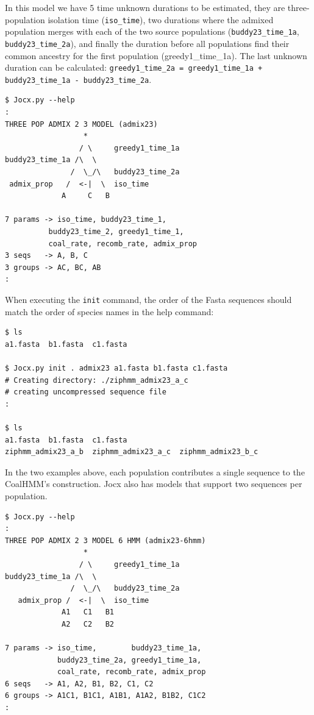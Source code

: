 \documentclass[graybox]{svmult}
\begin{document}

In this model we have 5 time unknown durations to be estimated, they are three-population isolation time (\texttt{iso\_time}), two durations where the admixed population merges with each of the two source populations (\texttt{buddy23\_time\_1a}, \texttt{buddy23\_time\_2a}), and finally the duration before all populations find their common ancestry for the first population (greedy1\_time\_1a).  The last unknown duration can be calculated: \texttt{greedy1\_time\_2a = greedy1\_time\_1a + buddy23\_time\_1a - buddy23\_time\_2a}.

 {\scriptsize{}\begin{verbatim}
$ Jocx.py --help
:
THREE POP ADMIX 2 3 MODEL (admix23)
                  *
                 / \     greedy1_time_1a
buddy23_time_1a /\  \
               /  \_/\   buddy23_time_2a
 admix_prop   /  <-|  \  iso_time
             A     C   B

7 params -> iso_time, buddy23_time_1,
          buddy23_time_2, greedy1_time_1,
          coal_rate, recomb_rate, admix_prop
3 seqs   -> A, B, C
3 groups -> AC, BC, AB
:
\end{verbatim}}

When executing the \texttt{init} command, the order of the Fasta sequences should match the order of species names in the help command:

 {\scriptsize{}\begin{verbatim}
$ ls
a1.fasta  b1.fasta  c1.fasta

$ Jocx.py init . admix23 a1.fasta b1.fasta c1.fasta
# Creating directory: ./ziphmm_admix23_a_c
# creating uncompressed sequence file
:

$ ls
a1.fasta  b1.fasta  c1.fasta
ziphmm_admix23_a_b  ziphmm_admix23_a_c  ziphmm_admix23_b_c
\end{verbatim}}

In the two examples above, each population contributes a single sequence to the CoalHMM's construction. Jocx also has models that support two sequences per population.

 {\scriptsize{}\begin{verbatim}
$ Jocx.py --help
:
THREE POP ADMIX 2 3 MODEL 6 HMM (admix23-6hmm)
                  *
                 / \     greedy1_time_1a
buddy23_time_1a /\  \
               /  \_/\   buddy23_time_2a
   admix_prop /  <-|  \  iso_time
             A1   C1   B1
             A2   C2   B2

7 params -> iso_time,        buddy23_time_1a,
            buddy23_time_2a, greedy1_time_1a,
            coal_rate, recomb_rate, admix_prop
6 seqs   -> A1, A2, B1, B2, C1, C2
6 groups -> A1C1, B1C1, A1B1, A1A2, B1B2, C1C2
:
\end{verbatim}}
\end{document}
